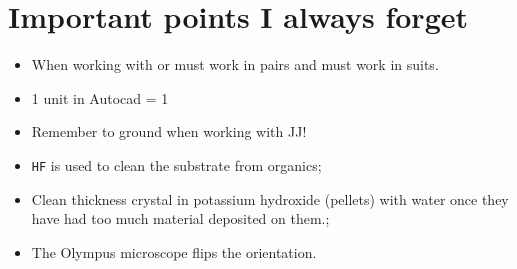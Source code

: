 \documentclass{phd_class}%
\begin{document}
\section*{Important points I always forget}\label{sec:important-points-i}

\begin{itemize}
\item When working with  or  must work in pairs and must
  work in suits.
\item 1 unit in Autocad = 1\mum
\item Remember to ground when working with JJ!
\item \texttt{HF} is used to clean the substrate from organics;
\item Clean thickness crystal in  potassium hydroxide (pellets) with water once
  they have had too much material deposited on them.;
\item The Olympus microscope flips the orientation.
\end{itemize}



\tableofcontents%
\newpage%

%
%
%
%
%
%
%
%
%
%
%
%
%
%
%
%
%
%
%
%
%
%
%
%
%
%
%
%
%
%
%
%
%
%
%
%
%
%
%
%
%
%
%
%
%
%
%
%
\end{document}
